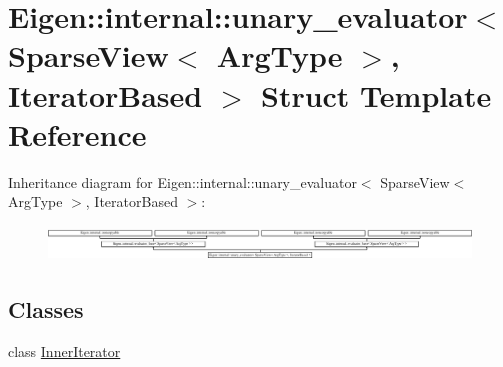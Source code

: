 \hypertarget{struct_eigen_1_1internal_1_1unary__evaluator_3_01_sparse_view_3_01_arg_type_01_4_00_01_iterator_based_01_4}{}\section{Eigen\+:\+:internal\+:\+:unary\+\_\+evaluator$<$ Sparse\+View$<$ Arg\+Type $>$, Iterator\+Based $>$ Struct Template Reference}
\label{struct_eigen_1_1internal_1_1unary__evaluator_3_01_sparse_view_3_01_arg_type_01_4_00_01_iterator_based_01_4}
Inheritance diagram for Eigen\+:\+:internal\+:\+:unary\+\_\+evaluator$<$ Sparse\+View$<$ Arg\+Type $>$, Iterator\+Based $>$\+:\begin{figure}[H]
\begin{center}
\leavevmode
\includegraphics[height=0.937500cm]{struct_eigen_1_1internal_1_1unary__evaluator_3_01_sparse_view_3_01_arg_type_01_4_00_01_iterator_based_01_4}
\end{center}
\end{figure}
\subsection*{Classes}
\begin{DoxyCompactItemize}
\item 
class \hyperlink{class_eigen_1_1internal_1_1unary__evaluator_3_01_sparse_view_3_01_arg_type_01_4_00_01_iterator_based_01_4_1_1_inner_iterator}{Inner\+Iterator}
\end{DoxyCompactItemize}
